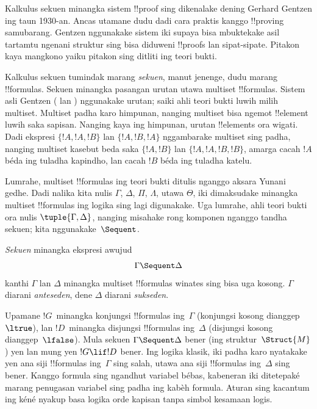\documentclass[../../../include/open-logic-section]{subfiles}
\begin{document}


Kalkulus sekuen minangka sistem !!{proof} sing dikenalake dening
Gerhard Gentzen ing taun 1930-an. Ancas utamane dudu dadi cara
praktis kanggo !!{proving} samubarang. Gentzen nggunakake sistem
iki supaya bisa mbuktekake asil tartamtu ngenani struktur sing
bisa diduweni !!{proof}s lan sipat-sipate. Pitakon kaya mangkono
yaiku pitakon sing ditliti ing teori bukti.

Kalkulus sekuen tumindak marang \emph{sekuen}, manut jenenge,
dudu marang !!{formula}s. Sekuen minangka pasangan urutan utawa
multiset !!{formula}s. Sistem asli Gentzen ( lan )
nggunakake urutan; saiki ahli teori bukti luwih milih multiset.
Multiset padha karo himpunan, nanging multiset bisa ngemot
!!{element} luwih saka sapisan. Nanging kaya ing himpunan,
urutan !!{element}s ora wigati. Dadi ekspresi $\{!A, !A, !B\}$
lan $\{!A, !B, !A\}$ nggambarake multiset sing padha, nanging
multiset kasebut beda saka $\{!A, !B\}$ lan $\{!A, !A, !B, !B\}$,
amarga cacah $!A$ béda ing tuladha kapindho, lan cacah $!B$
béda ing tuladha katelu.

Lumrahe, multiset !!{formula}s ing teori bukti ditulis nganggo
aksara Yunani gedhe. Dadi nalika kita nulis $\Gamma$, $\Delta$,
$\Pi$, $\Lambda$, utawa $\Theta$, iki dimaksudake minangka
multiset !!{formula}s ing logika sing lagi digunakake. Uga
lumrahe, ahli teori bukti ora nulis $\tuple{\Gamma, \Delta}$,
nanging misahake rong komponen nganggo tandha sekuen;
kita nggunakake~$\Sequent$.

\begin{defn}[Sekuen]
\emph{Sekuen} minangka ekspresi awujud
\[
\Gamma \Sequent \Delta
\]
kanthi $\Gamma$ lan $\Delta$ minangka multiset !!{formula}s winates
sing bisa uga kosong. $\Gamma$ diarani \emph{anteseden}, dene
$\Delta$ diarani \emph{sukseden}.
\end{defn}

Upamane $!G$~minangka konjungsi !!{formula}s ing~$\Gamma$
(konjungsi kosong dianggep~$\ltrue$), lan $!D$~minangka
disjungsi !!{formula}s ing~$\Delta$ (disjungsi kosong
dianggep~$\lfalse$). Mula sekuen $\Gamma \Sequent \Delta$ bener
(ing struktur~$\Struct{M}$) yen lan mung yen $!G \lif !D$ bener.
Ing logika klasik, iki padha karo nyatakake yen ana siji
!!{formula}s ing~$\Gamma$ sing salah, utawa ana siji
!!{formula}s ing~$\Delta$ sing bener.
Kanggo formula sing ngandhut variabel bébas, kabeneran iki
ditetepaké marang penugasan variabel sing padha ing kabèh formula.
Aturan sing kacantum ing kéné nyakup basa logika orde kapisan
tanpa simbol kesamaan logis.
\end{document}
